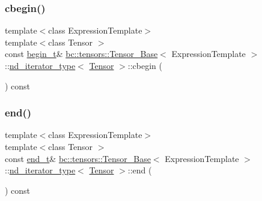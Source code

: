\mbox{\label{structbc_1_1tensors_1_1Tensor__Base_1_1nd__iterator__type_a47ce60b97e3d8d74890a6cc01ea98630}} 
\subsubsection{\texorpdfstring{cbegin()}{cbegin()}}
{\footnotesize\ttfamily template$<$class Expression\+Template$>$ \\
template$<$class Tensor $>$ \\
const \hyperlink{structbc_1_1tensors_1_1Tensor__Base_1_1nd__iterator__type_a9b63eaeda87e319d02d937a5ebcb6cdf}{begin\+\_\+t}\& \hyperlink{classbc_1_1tensors_1_1Tensor__Base}{bc\+::tensors\+::\+Tensor\+\_\+\+Base}$<$ Expression\+Template $>$\+::\hyperlink{structbc_1_1tensors_1_1Tensor__Base_1_1nd__iterator__type}{nd\+\_\+iterator\+\_\+type}$<$ \hyperlink{namespacebc_a659391e47ab612be3ba6c18cf9c89159}{Tensor} $>$\+::cbegin (\begin{DoxyParamCaption}{ }\end{DoxyParamCaption}) const\hspace{0.3cm}{\ttfamily [inline]}}

\mbox{\label{structbc_1_1tensors_1_1Tensor__Base_1_1nd__iterator__type_aa4eda31e9f2052dc1c555a5cd1e9b2bc}} 
\subsubsection{\texorpdfstring{end()}{end()}}
{\footnotesize\ttfamily template$<$class Expression\+Template$>$ \\
template$<$class Tensor $>$ \\
const \hyperlink{structbc_1_1tensors_1_1Tensor__Base_1_1nd__iterator__type_a3c6a8833df7b94e13446d929cd57e257}{end\+\_\+t}\& \hyperlink{classbc_1_1tensors_1_1Tensor__Base}{bc\+::tensors\+::\+Tensor\+\_\+\+Base}$<$ Expression\+Template $>$\+::\hyperlink{structbc_1_1tensors_1_1Tensor__Base_1_1nd__iterator__type}{nd\+\_\+iterator\+\_\+type}$<$ \hyperlink{namespacebc_a659391e47ab612be3ba6c18cf9c89159}{Tensor} $>$\+::end (\begin{DoxyParamCaption}{ }\end{DoxyParamCaption}) const\hspace{0.3cm}{\ttfamily [inline]}}



